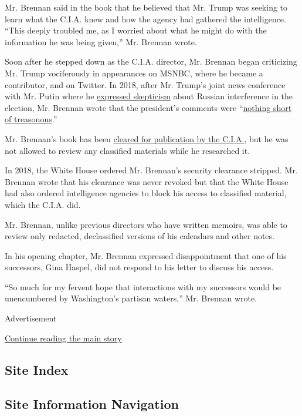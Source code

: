 Mr. Brennan said in the book that he believed that Mr. Trump was seeking
to learn what the C.I.A. knew and how the agency had gathered the
intelligence. ``This deeply troubled me, as I worried about what he
might do with the information he was being given,'' Mr. Brennan wrote.

Soon after he stepped down as the C.I.A. director, Mr. Brennan began
criticizing Mr. Trump vociferously in appearances on MSNBC, where he
became a contributor, and on Twitter. In 2018, after Mr. Trump's joint
news conference with Mr. Putin where he
\href{https://www.nytimes.com/2018/07/16/world/europe/trump-putin-election-intelligence.html}{expressed
skepticism} about Russian interference in the election, Mr. Brennan
wrote that the president's comments were
``\href{https://twitter.com/johnbrennan/status/1018885971104985093?lang=en}{nothing
short of treasonous}.''

Mr. Brennan's book has been
\href{https://twitter.com/nick_shapiro/status/1288466966135500800}{cleared
for publication by the C.I.A.}, but he was not allowed to review any
classified materials while he researched it.

In 2018, the White House ordered Mr. Brennan's security clearance
stripped. Mr. Brennan wrote that his clearance was never revoked but
that the White House had also ordered intelligence agencies to block his
access to classified material, which the C.I.A. did.

Mr. Brennan, unlike previous directors who have written memoirs, was
able to review only redacted, declassified versions of his calendars and
other notes.

In his opening chapter, Mr. Brennan expressed disappointment that one of
his successors, Gina Haspel, did not respond to his letter to discuss
his access.

``So much for my fervent hope that interactions with my successors would
be unencumbered by Washington's partisan waters,'' Mr. Brennan wrote.

Advertisement

\protect\hyperlink{after-bottom}{Continue reading the main story}

\hypertarget{site-index}{%
\subsection{Site Index}\label{site-index}}

\hypertarget{site-information-navigation}{%
\subsection{Site Information
Navigation}\label{site-information-navigation}}

